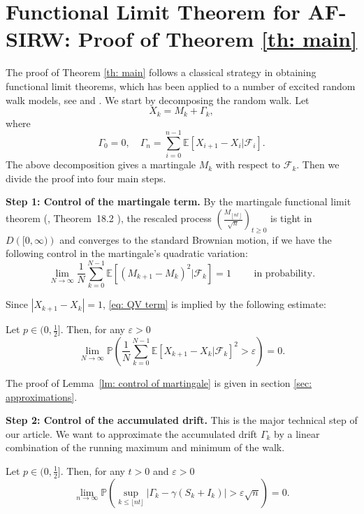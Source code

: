 \documentclass[EJP]{ejpecp} %
\newcommand{\abs}[1]{\left\vert #1 \right\vert}
\begin{document}
\section{Functional Limit Theorem for AF-SIRW: Proof of Theorem \ref{th: main}}
\label{sec: proof of main}

The proof of Theorem \ref{th: main} follows a classical strategy in obtaining functional limit theorems,
which has been applied to a number of excited random walk models, see \cite{KP16} and \cite{KMP23}.
We start by decomposing the random walk. Let
\begin{equation}
	\label{eq:decomposition}
	X_k = M_k+ \Gamma_k 
	,\end{equation} 
where
\[ 
\Gamma_0 = 0, \quad \Gamma_n = \sum_{i=0}^{n-1} \mathbb{E}\left[ X_{i+1}-X_i | \mathcal{F}_i
\right].
\]
The above decomposition gives a martingale $M_k$ with respect to $\mathcal{F}_k$.
Then we divide the proof into four main steps. 

\vspace{1em}

\textbf{Step 1: Control of the martingale term.}
By the martingale functional limit theorem (\cite{B99}, Theorem~18.2 ), the rescaled process $\left( \frac{M_{\left\lfloor n t \right\rfloor}}{\sqrt{n}} \right) _{t \ge 0}$ is tight in $D\left( [0,\infty ) \right) $ and converges to the standard Brownian motion, if we have the following control in the martingale's quadratic variation:
\begin{equation}\label{eq: QV term}
	\lim_{N\to \infty}\frac{1}{N} \sum_{k=0}^{N-1}\mathbb{E}\left[ (M_{k+1}- M_{k})^2 |\mathcal{F}_k \right] =1 \qquad  \mbox{ in probability}.
\end{equation}

Since $\abs{X_{k+1}-X_k}=1$, \eqref{eq: QV term} is implied by the following estimate:
\begin{lemma} \label{lm: control of martingale} 
	Let $p\in (0,\frac{1}{2}]$. Then, for any $\varepsilon >0$
	\begin{equation}
		\lim_{N \to \infty }\mathbb{P}\left(\frac{1}{N} \sum_{k = 0}^{N-1} \mathbb{E}\left[ X_{k+1} - X_k | \mathcal{F}_k \right]^2 > \varepsilon \right) =0. 
	\end{equation}
\end{lemma}
The proof of Lemma~\ref{lm: control of martingale} is given in section \ref{sec: approximations}.

\textbf{Step 2: Control of the accumulated drift.} This is the major technical step of our article. We want to approximate the accumulated drift $\Gamma_k$ by a linear combination of the running maximum and minimum of the walk.
\begin{lemma}\label{lm: control of acc drift}
	Let $p\in (0,\frac{1}{2}]$. Then, for any $t>0$ and $\varepsilon >0$
	\begin{equation}
		\lim_{n \to \infty }\mathbb{P}\left(\sup_{k\leq \lfloor nt\rfloor} \abs{\Gamma_k - \gamma \left(S_k + I_k \right)   } > \varepsilon \sqrt{n}  \right) =0. 
	\end{equation}
\end{lemma}
\end{document}
